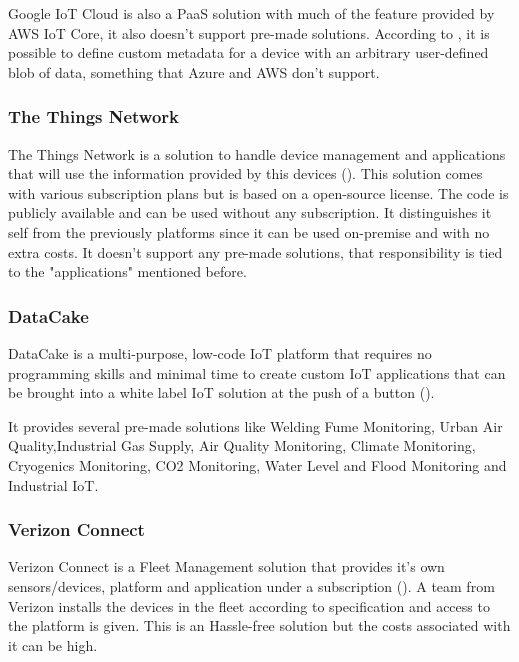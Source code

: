 Google IoT Cloud is also a \gls{PaaS} solution with much of the feature provided by AWS IoT Core, it also doesn't support pre-made solutions. According to \cite{pierleoni2019amazon}, it is possible to define custom metadata for a device with an arbitrary user-defined blob of data, something that Azure and AWS don't support.

\subsubsection{The Things Network}
\label{subsubsec:stateofart:iot:solutions:ttn}

The Things Network is a solution to handle device management and applications that will use the information provided by this devices (\cite{ttn}). This solution comes with various subscription plans but is based on a open-source license. The code is publicly available and can be used without any subscription. It distinguishes it self from the previously platforms since it can be used on-premise and with no extra costs. It doesn't support any pre-made solutions, that responsibility is tied to the "applications" mentioned before.

\subsubsection{DataCake}
\label{subsubsec:stateofart:iot:solutions:datacake}

DataCake is a multi-purpose, low-code \gls{IoT} platform that requires no programming skills and minimal time to create custom \gls{IoT} applications that can be brought into a white label \gls{IoT} solution at the push of a button (\cite{datacake}).

It provides several pre-made solutions like Welding Fume Monitoring, Urban Air Quality,Industrial Gas Supply, Air Quality Monitoring, Climate Monitoring, Cryogenics Monitoring, CO2 Monitoring, Water Level and Flood Monitoring and Industrial \gls{IoT}.

\subsubsection{Verizon Connect}
\label{subsubsec:stateofart:iot:solutions:verizon}

Verizon Connect is a Fleet Management solution that provides it's own sensors/devices, platform and application under a subscription (\cite{verizon-iot}).
A team from Verizon installs the devices in the fleet according to specification and access to the platform is given. This is an Hassle-free solution but the costs associated with it can be high.

